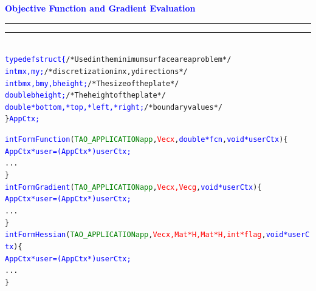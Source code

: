 \documentclass{seminar}
\newcommand{\redstripe}{\textcolor{red}{\hrule height 2.0pt\hfil}
             \vspace{-1.8pt}
             \textcolor{red}{\hrule height 1.0pt\hfil}
}
\newcommand{\heading}[1]{%
   \centerline{\textcolor{blue}{\textbf{#1}}}%
    \redstripe%
    \bigskip
}
\begin{document}
\begin{slide}

\heading{Objective Function and Gradient Evaluation}

\begin{alltt}
\scriptsize \setlength{\baselineskip}{8pt}
\textcolor{blue}{
  typedef struct \{}          /* Used in the minimum surface area problem */
    \textcolor{blue}{int         mx, my;}            /* discretization in x, y directions */
    \textcolor{blue}{int         bmx, bmy, bheight;}             /* The size of the plate */
    \textcolor{blue}{double      bheight;}                     /* The height of the plate */
    \textcolor{blue}{double     *bottom, *top, *left, *right;}         /* boundary values */
  \} \textcolor{blue}{AppCtx;}

  \textcolor{blue}{int FormFunction}(\textcolor{green}{TAO_APPLICATION app}, \textcolor{red}{Vec x}, \textcolor{blue}{double *fcn}, \textcolor{blue}{void *userCtx})\{
     \textcolor{blue}{AppCtx *user = (AppCtx *)userCtx;}
     ...
  \}
  \textcolor{blue}{int FormGradient}(\textcolor{green}{TAO_APPLICATION app}, \textcolor{red}{Vec x, Vec g}, \textcolor{blue}{void *userCtx})\{
     \textcolor{blue}{AppCtx *user = (AppCtx *)userCtx;}
     ...
  \}
  \textcolor{blue}{int FormHessian}(\textcolor{green}{TAO_APPLICATION app}, \textcolor{red}{Vec x, Mat *H, Mat *H, int *flag}, \textcolor{blue}{void *userCtx})\{
     \textcolor{blue}{AppCtx *user = (AppCtx *)userCtx;}
     ...
  \}

\end{alltt}

\vfill

\end{slide}
\end{document}
